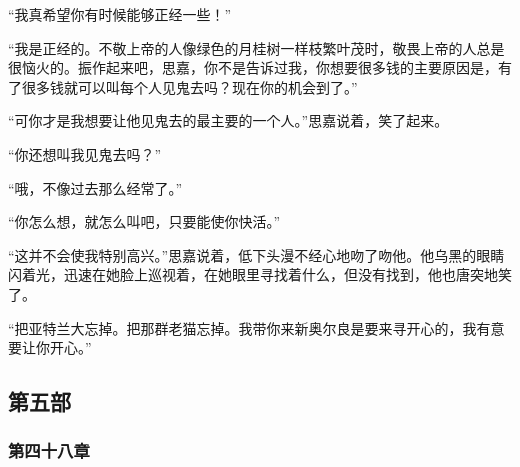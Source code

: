 \par “我真希望你有时候能够正经一些！”
\par “我是正经的。不敬上帝的人像绿色的月桂树一样枝繁叶茂时，敬畏上帝的人总是很恼火的。振作起来吧，思嘉，你不是告诉过我，你想要很多钱的主要原因是，有了很多钱就可以叫每个人见鬼去吗？现在你的机会到了。”
\par “可你才是我想要让他见鬼去的最主要的一个人。”思嘉说着，笑了起来。
\par “你还想叫我见鬼去吗？”
\par “哦，不像过去那么经常了。”
\par “你怎么想，就怎么叫吧，只要能使你快活。”
\par “这并不会使我特别高兴。”思嘉说着，低下头漫不经心地吻了吻他。他乌黑的眼睛闪着光，迅速在她脸上巡视着，在她眼里寻找着什么，但没有找到，他也唐突地笑了。
\par “把亚特兰大忘掉。把那群老猫忘掉。我带你来新奥尔良是要来寻开心的，我有意要让你开心。”







\subsection{第五部}

\subsubsection{第四十八章}

